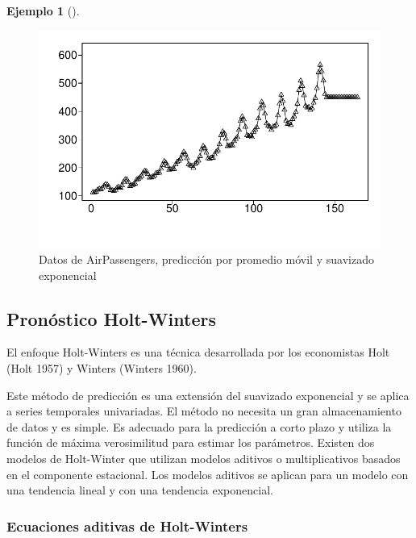 \documentclass[
  us-letterpaper,
]{scrreprt}
\theoremstyle{plain}
\theoremstyle{definition}
\newtheorem{example}{Ejemplo}[chapter]
\theoremstyle{plain}
\theoremstyle{definition}
\theoremstyle{remark}
\begin{document}
\begin{example}[]
\begin{tcolorbox}
\begin{figure}[H]
\begin{minipage}{0.33\linewidth}
{\includegraphics{series_files/figure-pdf/fig-PAP-3.pdf}

}


\end{minipage}%

\caption{\label{fig-PAP}Datos de AirPassengers, predicción por promedio
móvil y suavizado exponencial}

\end{figure}%

\end{tcolorbox}

\end{example}

\subsection{Pronóstico Holt-Winters}\label{pronuxf3stico-holt-winters}

El enfoque Holt-Winters es una técnica desarrollada por los economistas
Holt (Holt 1957) y Winters (Winters 1960).

Este método de predicción es una extensión del suavizado exponencial y
se aplica a series temporales univariadas. El método no necesita un gran
almacenamiento de datos y es simple. Es adecuado para la predicción a
corto plazo y utiliza la función de máxima verosimilitud para estimar
los parámetros. Existen dos modelos de Holt-Winter que utilizan modelos
aditivos o multiplicativos basados en el componente estacional. Los
modelos aditivos se aplican para un modelo con una tendencia lineal y
con una tendencia exponencial.

\subsubsection{Ecuaciones aditivas de
Holt-Winters}\label{ecuaciones-aditivas-de-holt-winters}
\end{document}
